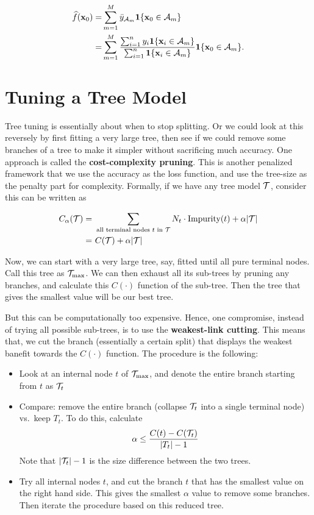 \documentclass[
]{book}
\providecommand{\tightlist}{%
  \setlength{\itemsep}{0pt}\setlength{\parskip}{0pt}}
\theoremstyle{definition}
\theoremstyle{definition}
\theoremstyle{definition}
\theoremstyle{definition}
\theoremstyle{remark}
\begin{document}
\begin{align}
\widehat{f}(\mathbf{x}_0) =& \sum_{m = 1}^M \bar{y}_{{\cal A}_m} \mathbf{1}\{\mathbf{x}_0 \in {\cal A}_m\} \\
=& \sum_{m = 1}^M \frac{\sum_{i=1}^n y_i \mathbf{1}\{\mathbf{x}_i \in {\cal A}_m\}}{\sum_{i=1}^n \mathbf{1}\{\mathbf{x}_i \in {\cal A}_m\}} \mathbf{1}\{\mathbf{x}_0 \in {\cal A}_m\}.
\end{align}

\hypertarget{tuning-a-tree-model}{%
\section{Tuning a Tree Model}\label{tuning-a-tree-model}}

Tree tuning is essentially about when to stop splitting. Or we could look at this reversely by first fitting a very large tree, then see if we could remove some branches of a tree to make it simpler without sacrificing much accuracy. One approach is called the \textbf{cost-complexity pruning}. This is another penalized framework that we use the accuracy as the loss function, and use the tree-size as the penalty part for complexity. Formally, if we have any tree model \({\cal T}\), consider this can be written as

\begin{align}
C_\alpha({\cal T}) =&~ \sum_{\text{all terminal nodes $t$ in ${\cal T}$}} N_t \cdot \text{Impurity}(t) + \alpha |{\cal T}| \nonumber \\
=&~ C({\cal T}) + \alpha |{\cal T}|
\end{align}

Now, we can start with a very large tree, say, fitted until all pure terminal nodes. Call this tree as \({\cal T}_\text{max}\). We can then exhaust all its sub-trees by pruning any branches, and calculate this \(C(\cdot)\) function of the sub-tree. Then the tree that gives the smallest value will be our best tree.

But this can be computationally too expensive. Hence, one compromise, instead of trying all possible sub-trees, is to use the \textbf{weakest-link cutting}. This means that, we cut the branch (essentially a certain split) that displays the weakest banefit towards the \(C(\cdot)\) function. The procedure is the following:

\begin{itemize}
\tightlist
\item
  Look at an internal node \(t\) of \({\cal T}_\text{max}\), and denote the entire branch starting from \(t\) as \({\cal T}_t\)
\item
  Compare: remove the entire branch (collapse \({\cal T}_t\) into a single terminal node) vs.~keep \(T_t\). To do this, calculate
  \[\alpha \leq \frac{C(t) - C({\cal T}_t)}{|T_t| - 1}\]
  Note that \(|{\cal T}_t| - 1\) is the size difference between the two trees.
\item
  Try all internal nodes \(t\), and cut the branch \(t\) that has the smallest value on the right hand side. This gives the smallest \(\alpha\) value to remove some branches. Then iterate the procedure based on this reduced tree.
\end{itemize}
\end{document}
